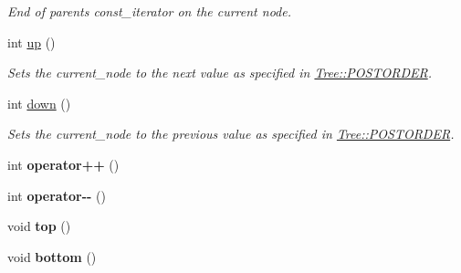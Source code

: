 \begin{DoxyCompactItemize}
\begin{DoxyCompactList}\small\item\em End of parents {\ttfamily const\+\_\+iterator} on the current node. \end{DoxyCompactList}\item 
\mbox{\label{classpruner_1_1TreeIterator_adca1d999f093a69e2f5d044b358e5da7}} 
int \hyperlink{classpruner_1_1TreeIterator_adca1d999f093a69e2f5d044b358e5da7}{up} ()
\begin{DoxyCompactList}\small\item\em Sets the {\ttfamily current\+\_\+node} to the next value as specified in \hyperlink{classpruner_1_1Tree_a547937e845fdbceafae4db25cd74f880}{Tree\+::\+P\+O\+S\+T\+O\+R\+D\+ER}. \end{DoxyCompactList}\item 
\mbox{\label{classpruner_1_1TreeIterator_a8534adba213df8f7f1e67bf5005d902e}} 
int \hyperlink{classpruner_1_1TreeIterator_a8534adba213df8f7f1e67bf5005d902e}{down} ()
\begin{DoxyCompactList}\small\item\em Sets the {\ttfamily current\+\_\+node} to the previous value as specified in \hyperlink{classpruner_1_1Tree_a547937e845fdbceafae4db25cd74f880}{Tree\+::\+P\+O\+S\+T\+O\+R\+D\+ER}. \end{DoxyCompactList}\item 
\mbox{\label{classpruner_1_1TreeIterator_aed2ad905c7c0cef8c2fd8e012c67dc5c}} 
int {\bfseries operator++} ()
\item 
\mbox{\label{classpruner_1_1TreeIterator_a08d18c38de3157a78b9d02899a605ed8}} 
int {\bfseries operator-\/-\/} ()
\item 
\mbox{\label{classpruner_1_1TreeIterator_a41f74b1ac47cd05ce7e08b46c93034f1}} 
void {\bfseries top} ()
\item 
\mbox{\label{classpruner_1_1TreeIterator_a1c8244cded3c2a573d2914549a19e177}} 
void {\bfseries bottom} ()
\item 
\mbox{\label{classpruner_1_1TreeIterator_aa0d37262febc59a1b229e98ce610b30a}} 

\end{DoxyCompactItemize}
